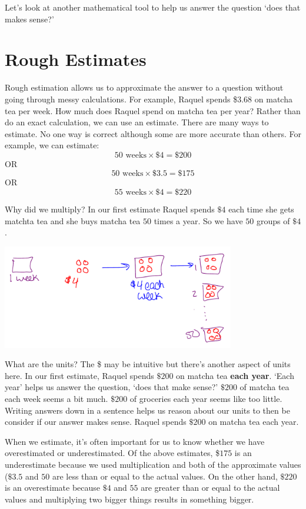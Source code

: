 \documentclass{ximera}
\begin{document}
Let's look at another mathematical tool to help us answer the question `does that makes sense?'

\section{Rough Estimates}
Rough estimation allows us to approximate the answer to a question without going through messy calculations. For example, Raquel spends \$$3.68$ on matcha tea per week. How much does Raquel spend on matcha tea per year? Rather than do an exact calculation, we can use an estimate. There are many ways to estimate.  No one way is correct although some are more accurate than others. For example, we can estimate:
$$50 \text{ weeks} \times \$4=\$200$$
OR $$50 \text{ weeks} \times \$3.5=\$175$$
OR $$55 \text{ weeks} \times \$4=\$220$$

Why did we multiply? In our first estimate Raquel spends $\$4$ each time she gets matchta tea and she buys matcha tea $50$ times a year.  So we have $50$ groups of $\$4$.

\begin{image}
    \includegraphics[width=4in]{dollarperyear.png}
\end{image}

What are the units? The \$ may be intuitive but there's another aspect of units here. In our first estimate, Raquel spends $\$200$ on matcha tea \textbf{each year}. `Each year' helps us answer the question, `does that make sense?' $\$200$ of matcha tea each week seems a bit much. $\$200$ of groceries each year seems like too little. Writing answers down in a sentence helps us reason about our units to then be consider if our answer makes sense. Raquel spends $\$200$ on matcha tea each year.

When we estimate, it's often important for us to know whether we have overestimated or underestimated.  Of the above estimates, \$$175$ is an underestimate because we used multiplication and both of the approximate values ($\$3.5$ and $50$ are less than or equal to the actual values.  On the other hand, $\$220$ is an overestimate because $\$4$ and $55$ are greater than or equal to the actual values and multiplying two bigger things results in something bigger. 
\end{document}
